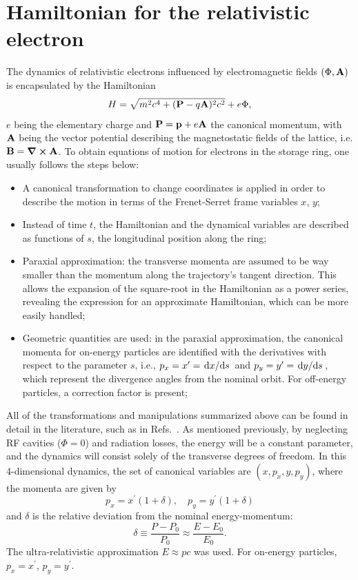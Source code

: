 \section{Hamiltonian for the relativistic electron}
The dynamics of relativistic electrons influenced by electromagnetic fields $(\Phi, \vb{A})$ is encapsulated by the Hamiltonian \cite{landau_classical_1975}
    \begin{equation*}
        H=\sqrt{m^2c^4+(\vb{P}-q\vb{A})^2c^2}+e\Phi,
    \end{equation*}
 $e$ being the elementary charge and $\vb{P}=\vb{p}+e\vb{A}$ the canonical momentum, with $\vb{A}$ being the vector potential describing the magnetostatic fields of the lattice, i.e. $\vb{B}=\curl \vb{A}$. To obtain equations of motion for electrons in the storage ring, one usually follows the steps below:
 \begin{itemize}
    \item A canonical transformation to change coordinates is applied in order to describe the motion in terms of the Frenet-Serret frame variables $x$, $y$;
    \item Instead of time $t$, the Hamiltonian and the dynamical variables are described as functions of $s$, the longitudinal position along the ring;
    \item Paraxial approximation: the transverse momenta are assumed to be way smaller than the momentum along the trajectory's tangent direction. This allows the expansion of the square-root in the Hamiltonian as a power series, revealing the expression for an approximate Hamiltonian, which can be more easily handled;
    \item Geometric quantities are used: in the paraxial approximation, the canonical momenta for on-energy particles are identified with the derivatives with respect to the parameter $s$, i.e., $p_x = x^\prime = \dv*{x}{s}$ and $p_y = y^\prime = \dv*{y}{s}$, which represent the divergence angles from the nominal orbit. For off-energy particles, a correction factor is present;
 \end{itemize}
 All of the transformations and manipulations summarized above can be found in detail in the literature, such as in Refs.~\cite{lee_accelerator_2004, wiedemann_particle_2015,  wolski_beam_2014}. As mentioned previously, by neglecting RF cavities ($\Phi=0$) and radiation losses, the energy will be a constant parameter, and the dynamics will consist solely of the transverse degrees of freedom.  In this 4-dimensional dynamics, the set of canonical variables are $(x,p_{x},y , p_{y})$, where the momenta are given by
\begin{equation} p_{x}= x^\prime(1+\delta),\quad p_{y}=y^\prime (1+\delta)\end{equation}
and $\delta$ is the relative deviation from the nominal energy-momentum:
\begin{equation}
    \delta \equiv \frac{P-P_{0}}{P_{0}}\approx\frac{E-E_0}{E_0}.
\end{equation}
The ultra-relativistic approximation $E\approx pc$ was used. For on-energy particles, $p_x = x^\prime$, $p_y = y^\prime$.

